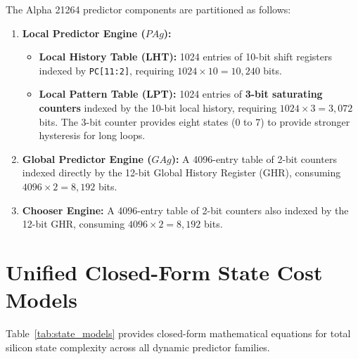 \documentclass[11pt,a4paper]{article}
\begin{document}
The Alpha 21264 predictor components are partitioned as follows:
\begin{enumerate}[leftmargin=1.8em, itemsep=0.3em]
    \item \textbf{Local Predictor Engine ($PAg$):} 
    \begin{itemize}[leftmargin=1.5em]
        \item \textbf{Local History Table (LHT):} 1024 entries of 10-bit shift registers indexed by \texttt{PC[11:2]}, requiring $1024 \times 10 = 10,240$ bits.
        \item \textbf{Local Pattern Table (LPT):} 1024 entries of \textbf{3-bit saturating counters} indexed by the 10-bit local history, requiring $1024 \times 3 = 3,072$ bits. The 3-bit counter provides eight states (0 to 7) to provide stronger hysteresis for long loops.
    \end{itemize}
    \item \textbf{Global Predictor Engine ($GAg$):} A 4096-entry table of 2-bit counters indexed directly by the 12-bit Global History Register (GHR), consuming $4096 \times 2 = 8,192$ bits.
    \item \textbf{Chooser Engine:} A 4096-entry table of 2-bit counters also indexed by the 12-bit GHR, consuming $4096 \times 2 = 8,192$ bits.
\end{enumerate}

\section{Unified Closed-Form State Cost Models}
\label{sec:cost_models}

Table~\ref{tab:state_models} provides closed-form mathematical equations for total silicon state complexity across all dynamic predictor families.
\end{document}
